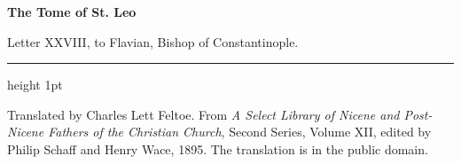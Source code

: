 \documentclass[11pt,letterpaper]{article}
\begin{document}
\color{ink}

\begin{center}
{\LARGE\bfseries\color{heading} The Tome of St. Leo\par}
\vspace{1.2em}
{\large Letter XXVIII, to Flavian, Bishop of Constantinople.\par}
\vspace{0.4em}
{\color{accent}\hrule height 1pt}
\end{center}
\vspace{1em}



\vspace{2em}
{\small\noindent Translated by Charles Lett Feltoe. From \emph{A Select Library of
Nicene and Post-Nicene Fathers of the Christian Church}, Second Series,
Volume XII, edited by Philip Schaff and Henry Wace, 1895. The translation
is in the public domain.\par}
\end{document}
